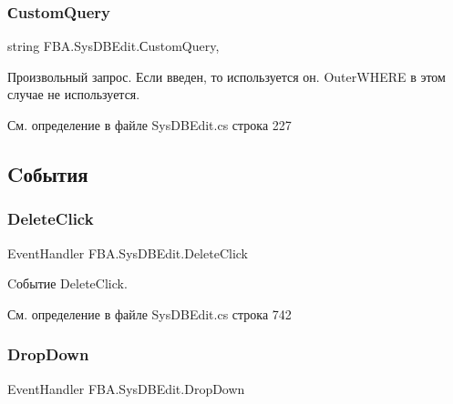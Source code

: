 \subsubsection{\texorpdfstring{Сustom\+Query}{СustomQuery}}
{\footnotesize\ttfamily string F\+B\+A.\+Sys\+D\+B\+Edit.\+Сustom\+Query\hspace{0.3cm}{\ttfamily [get]}, {\ttfamily [set]}}



Произвольный запрос. Если введен, то используется он. Outer\+W\+H\+E\+RE в этом случае не используется. 



См. определение в файле Sys\+D\+B\+Edit.\+cs строка 227



\subsection{Cобытия}
\mbox{\label{class_f_b_a_1_1_sys_d_b_edit_a33013d37e1be0fc2bd617ab95bf70d3f}} 
\subsubsection{\texorpdfstring{Delete\+Click}{DeleteClick}}
{\footnotesize\ttfamily Event\+Handler F\+B\+A.\+Sys\+D\+B\+Edit.\+Delete\+Click}



Cобытие Delete\+Click. 



См. определение в файле Sys\+D\+B\+Edit.\+cs строка 742

\mbox{\label{class_f_b_a_1_1_sys_d_b_edit_a2547815fbfa8bbb59c456cef2e01825b}} 
\subsubsection{\texorpdfstring{Drop\+Down}{DropDown}}
{\footnotesize\ttfamily Event\+Handler F\+B\+A.\+Sys\+D\+B\+Edit.\+Drop\+Down}



